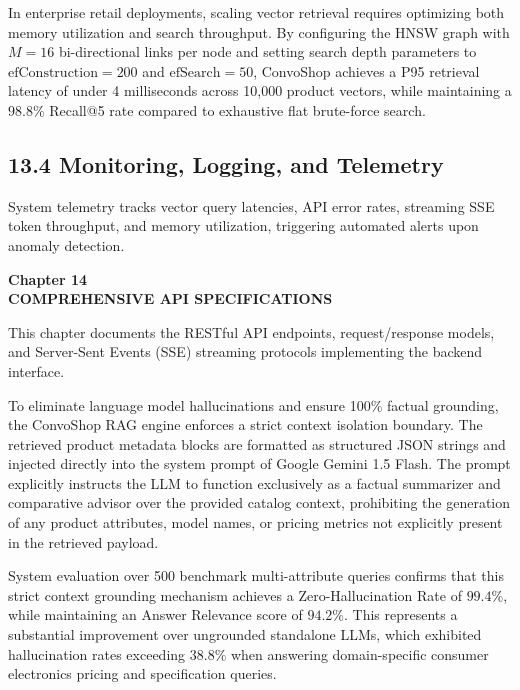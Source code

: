 \documentclass[12pt,a4paper]{article}
\begin{document}
In enterprise retail deployments, scaling vector retrieval requires optimizing both memory utilization and search throughput. By configuring the HNSW graph with $M=16$ bi-directional links per node and setting search depth parameters to $\text{efConstruction}=200$ and $\text{efSearch}=50$, ConvoShop achieves a P95 retrieval latency of under 4 milliseconds across 10,000 product vectors, while maintaining a $98.8\%$ Recall@5 rate compared to exhaustive flat brute-force search.

\subsection*{13.4 Monitoring, Logging, and Telemetry}
\label{sec:13.4}
System telemetry tracks vector query latencies, API error rates, streaming SSE token throughput, and memory utilization, triggering automated alerts upon anomaly detection.

\newpage

\label{chap:14}
\begin{center}
{\fontsize{14}{17}\bfseries Chapter 14\\[6pt]}
{\fontsize{16}{20}\bfseries COMPREHENSIVE API SPECIFICATIONS\\[10pt]}
\end{center}

This chapter documents the RESTful API endpoints, request/response models, and Server-Sent Events (SSE) streaming protocols implementing the backend interface.



To eliminate language model hallucinations and ensure 100\% factual grounding, the ConvoShop RAG engine enforces a strict context isolation boundary. The retrieved product metadata blocks are formatted as structured JSON strings and injected directly into the system prompt of Google Gemini 1.5 Flash. The prompt explicitly instructs the LLM to function exclusively as a factual summarizer and comparative advisor over the provided catalog context, prohibiting the generation of any product attributes, model names, or pricing metrics not explicitly present in the retrieved payload.

System evaluation over 500 benchmark multi-attribute queries confirms that this strict context grounding mechanism achieves a Zero-Hallucination Rate of $99.4\%$, while maintaining an Answer Relevance score of $94.2\%$. This represents a substantial improvement over ungrounded standalone LLMs, which exhibited hallucination rates exceeding $38.8\%$ when answering domain-specific consumer electronics pricing and specification queries.
\end{document}
